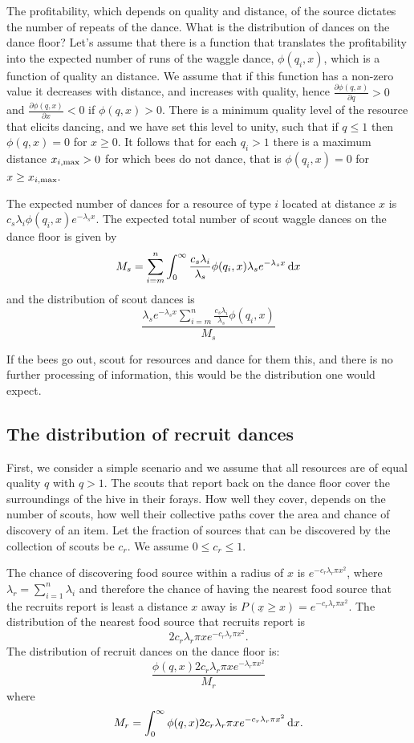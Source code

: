 \documentclass[12pt,letter]{amsart}
\newcommand{\df}[0]{{\,\rm d }}
\begin{document}
The profitability, which depends on quality and distance, of the source dictates the number of repeats of the dance.
What is the distribution of dances on the dance floor?  Let's assume that there is a function that translates the profitability into the expected number of runs of the waggle dance, $\phi(q_i, x)$,  which is a function of quality an distance. We assume that if this function has a non-zero value it decreases with distance, and increases with quality, hence $\frac{\partial \phi(q, x) }{\partial q}>0$ and $\frac{\partial \phi(q, x) }{\partial  x}<0$ if $\phi(q,x)>0$. There is a minimum quality level of the resource that elicits dancing, and we have set this level to unity, such that if $q \le 1$ then $\phi(q, x)=0$ for $x \ge 0$. It follows that for each $q_i>1$ there is a maximum distance $x_{i, {\rm max}}>0$ for which bees do not dance, that is $\phi(q_i, x)=0$ for $x \ge x_{i, {\rm max}}.$

The expected number of dances for a resource of type $i$ located at distance $x$ is $c_s \lambda_i \phi(q_i, x) e^{-\lambda_s x}.$ The expected total number of scout waggle dances on the dance floor is given by $$M_s=\sum_{i=m}^n \int_{0}^\infty \frac{c_s \lambda_i}{\lambda_s} \phi(q_i, x) \lambda_s e^{-\lambda_s x} \df x
$$ and the distribution of scout dances is
$$\frac{\lambda_s e^{-\lambda_s x}\sum_{i=m}^n  \frac{c_s \lambda_i}{\lambda_s} \phi(q_i, x)  }{M_s}
$$

If the bees go out, scout for resources and dance for them this, and there is no further processing of information, this would be the distribution one would expect.

\subsection*{The distribution of recruit dances}

First, we consider a simple scenario and we assume that all resources are of equal quality $q$ with $q>1$. The scouts that report back on the dance floor cover the surroundings of the hive in their forays. How well they cover, depends on the number of scouts, how well their collective paths cover the area and chance of discovery of an item. Let the fraction of sources that can be discovered by the collection of scouts be $c_r$. We assume $0\le c_r \le 1.$

The chance of discovering food source within a radius of $x$ is $e^{-c_r\lambda_r\pi x^2}$, where $\lambda_r= \sum_{i=1}^n \lambda_i  $ and therefore the chance of having the nearest food source that the recruits report is least a distance $x$ away is $P(\underline x \ge x)=e^{-c_r\lambda_r \pi x^2}.$ The distribution of the nearest food source that recruits report is $$2 c_r\lambda_r \pi x e^{-c_r\lambda_r \pi x^2}.$$ The distribution of recruit dances on the dance floor is:
$$\frac{\phi(q,x)2 c_r\lambda_r \pi x e^{-\lambda_r \pi x^2}}{M_r}$$ where
$$M_r=\int_0^\infty \phi(q,x)2c_r \lambda_r \pi x e^{-c_r\lambda_r \pi x^2} \df x.$$
\end{document}
